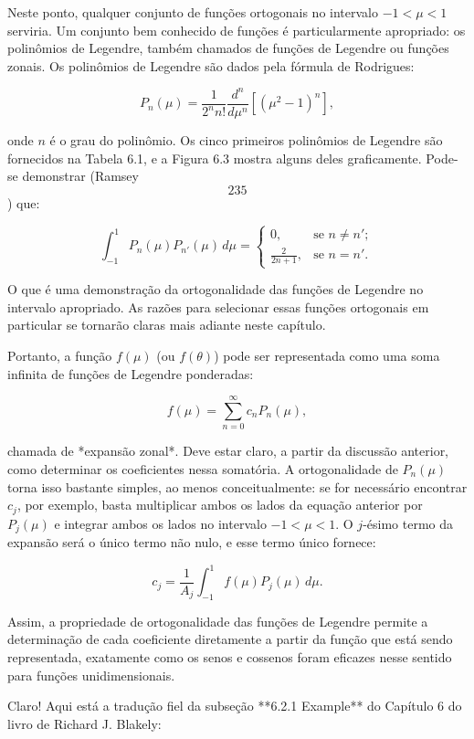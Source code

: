Neste ponto, qualquer conjunto de funções ortogonais no intervalo $-1 < \mu < 1$ serviria. Um conjunto bem conhecido de funções é particularmente apropriado: os polinômios de Legendre, também chamados de funções de Legendre ou funções zonais. Os polinômios de Legendre são dados pela fórmula de Rodrigues:

$$
P_n(\mu) = \frac{1}{2^n n!} \frac{d^n}{d\mu^n}[(\mu^2 - 1)^n],
$$

onde $n$ é o grau do polinômio. Os cinco primeiros polinômios de Legendre são fornecidos na Tabela 6.1, e a Figura 6.3 mostra alguns deles graficamente. Pode-se demonstrar (Ramsey \[235\]) que:

$$
\int_{-1}^{1} P_n(\mu) P_{n'}(\mu) \, d\mu =
\begin{cases}
0, & \text{se } n \ne n'; \\
\frac{2}{2n + 1}, & \text{se } n = n'. \tag{6.7}
\end{cases}
$$

O que é uma demonstração da ortogonalidade das funções de Legendre no intervalo apropriado. As razões para selecionar essas funções ortogonais em particular se tornarão claras mais adiante neste capítulo.

Portanto, a função $f(\mu)$ (ou $f(\theta)$) pode ser representada como uma soma infinita de funções de Legendre ponderadas:

$$
f(\mu) = \sum_{n=0}^{\infty} c_n P_n(\mu), \tag{6.8}
$$

chamada de *expansão zonal*. Deve estar claro, a partir da discussão anterior, como determinar os coeficientes nessa somatória. A ortogonalidade de $P_n(\mu)$ torna isso bastante simples, ao menos conceitualmente: se for necessário encontrar $c_j$, por exemplo, basta multiplicar ambos os lados da equação anterior por $P_j(\mu)$ e integrar ambos os lados no intervalo $-1 < \mu < 1$. O $j$-ésimo termo da expansão será o único termo não nulo, e esse termo único fornece:

$$
c_j = \frac{1}{A_j} \int_{-1}^{1} f(\mu) P_j(\mu) \, d\mu. \tag{6.9}
$$

Assim, a propriedade de ortogonalidade das funções de Legendre permite a determinação de cada coeficiente diretamente a partir da função que está sendo representada, exatamente como os senos e cossenos foram eficazes nesse sentido para funções unidimensionais.


Claro! Aqui está a tradução fiel da subseção **6.2.1 Example** do Capítulo 6 do livro de Richard J. Blakely:


